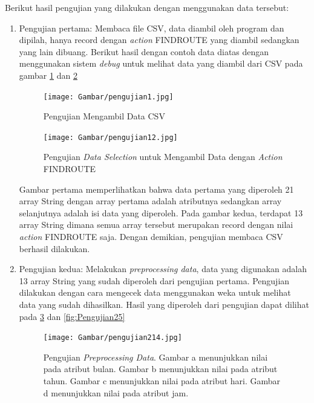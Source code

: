 Berikut hasil pengujian yang dilakukan dengan menggunakan data tersebut:
\begin{enumerate}
	\item Pengujian pertama: Membaca file CSV, data diambil oleh program dan dipilah, hanya record dengan \textsl{action} FINDROUTE yang diambil sedangkan yang lain dibuang. Berikut hasil dengan contoh data diatas dengan menggunakan sistem \textsl{debug} untuk melihat data yang diambil dari CSV pada gambar \ref{fig:Pengujian1} dan \ref{fig:Pengujian12}
	
	\begin{figure}[H]
	\centering
	\texttt{[image: Gambar/pengujian1.jpg]}
	\caption[Pengujian Mengambil Data CSV]{Pengujian Mengambil Data CSV} 
	\label{fig:Pengujian1}
	\end{figure}

	\begin{figure}[H]
	\centering
	\texttt{[image: Gambar/pengujian12.jpg]}
	\caption[Pengujian \textsl{Data Selection} untuk Mengambil Data dengan \textsl{Action} FINDROUTE]{Pengujian \textsl{Data Selection} untuk Mengambil Data dengan \textsl{Action} FINDROUTE} 
	\label{fig:Pengujian12}
	\end{figure}

	Gambar pertama memperlihatkan bahwa data pertama yang diperoleh 21 array String dengan array pertama adalah atributnya sedangkan array selanjutnya adalah isi data yang diperoleh. Pada gambar kedua, terdapat 13 array String dimana semua array tersebut merupakan record dengan nilai \textsl{action} FINDROUTE saja. Dengan demikian, pengujian membaca CSV berhasil dilakukan.

	\item Pengujian kedua: Melakukan \textsl{preprocessing data}, data yang digunakan adalah 13 array String yang sudah diperoleh dari pengujian pertama. Pengujian dilakukan dengan cara mengecek data menggunakan weka untuk melihat data yang sudah dihasilkan. Hasil yang diperoleh dari pengujian dapat dilihat pada \ref{fig:Pengujian214} dan \ref{fig:Pengujian25} 
	
	\begin{figure}[ht]
	\centering
	\texttt{[image: Gambar/pengujian214.jpg]}
	\caption[Pengujian \textsl{Preprocessing Data}]{Pengujian \textsl{Preprocessing Data}. Gambar a menunjukkan nilai pada atribut bulan. Gambar b menunjukkan nilai pada atribut tahun. Gambar c menunjukkan nilai pada atribut hari. Gambar d menunjukkan nilai pada atribut jam.} 
	\label{fig:Pengujian214}
	\end{figure}
	

\end{enumerate}
